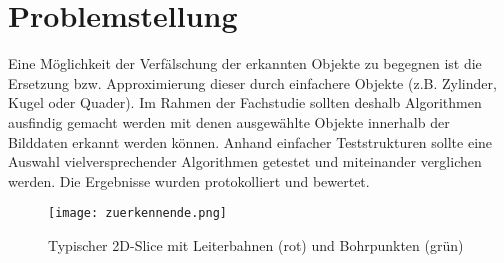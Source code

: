 
\chapter{Problemstellung}
Eine Möglichkeit der Verfälschung der erkannten Objekte zu begegnen ist die Ersetzung bzw. Approximierung dieser durch einfachere Objekte (z.B. Zylinder, Kugel oder Quader). Im Rahmen der Fachstudie sollten deshalb Algorithmen ausfindig gemacht werden mit denen ausgewählte Objekte innerhalb der Bilddaten erkannt werden können. Anhand einfacher Teststrukturen sollte eine Auswahl vielversprechender Algorithmen getestet und miteinander verglichen werden. Die Ergebnisse wurden protokolliert und bewertet.

\begin{figure}[H]
  \begin{center}
    \texttt{[image: zuerkennende.png]}
    \caption{Typischer 2D-Slice mit Leiterbahnen (rot) und Bohrpunkten (grün)}
    \label{fig:zuerkennende1}
  \end{center}
\end{figure}